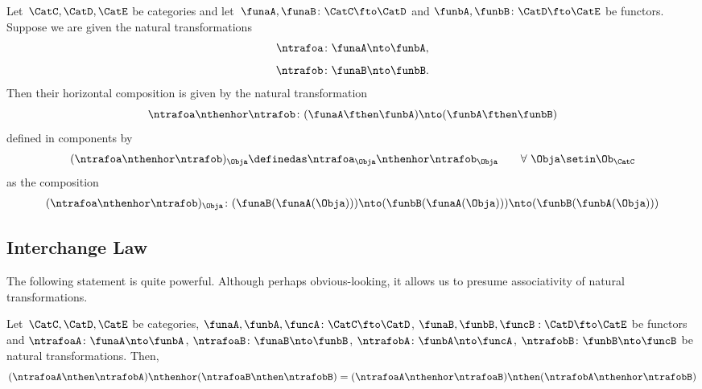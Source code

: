 \begin{ctdefinition}
    \label{def:horizontal-composition}
    Let~$\CatC, \CatD, \CatE$ be categories and let~$\funaA,\funaB\colon\CatC \fto \CatD$ and $\funbA,\funbB\colon \CatD \fto \CatE$ be functors.
    Suppose we are given the natural transformations
    \begin{equation}
        \ntrafoa \colon \funaA \nto \funbA,
    \end{equation}
    \begin{equation}
        \ntrafob \colon \funaB \nto \funbB.
    \end{equation}
    Then their horizontal composition is given by the natural transformation
    \begin{equation}
        \ntrafoa \nthenhor \ntrafob\colon (\funaA \fthen \funbA) \nto (\funbA \fthen \funbB)
    \end{equation}
    defined in components by
    \begin{equation}
        (\ntrafoa \nthenhor \ntrafob)_{\Obja} \definedas \ntrafoa_{\Obja} \nthenhor \ntrafob_{\Obja} \quad \quad \forall \ \Obja \setin \Ob_\CatC
    \end{equation}
    as the composition
    \begin{equation}
        (\ntrafoa \nthenhor \ntrafob)_{\Obja} \colon (\funaB(\funaA(\Obja))) \nto (\funbB(\funaA(\Obja))) \nto (\funbB(\funbA(\Obja)))
    \end{equation}
\end{ctdefinition}

\subsection{Interchange Law}

The following statement is quite powerful.
Although perhaps obvious-looking, it allows us to presume associativity of
natural transformations.

\begin{proposition}[Interchange] \label{prop:interchange}
    Let~$\CatC, \CatD, \CatE$ be categories, $\funaA, \funbA, \funcA\colon\CatC \fto \CatD$, $\funaB, \funbB, \funcB:\CatD \fto \CatE$ be functors and $\ntrafoaA\colon\funaA\nto\funbA$, $\ntrafoaB\colon\funaB\nto\funbB$, $\ntrafobA\colon\funbA\nto\funcA$, $\ntrafobB\colon\funbB\nto\funcB$ be natural transformations.
    Then,
    \begin{equation}
        (\ntrafoaA \nthen \ntrafobA) \nthenhor (\ntrafoaB \nthen \ntrafobB) =
        (\ntrafoaA \nthenhor \ntrafoaB) \nthen (\ntrafobA \nthenhor \ntrafobB)
    \end{equation}
\end{proposition}

